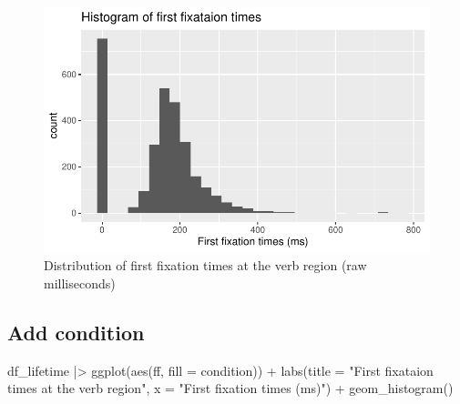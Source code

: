 \documentclass[
  letterpaper,
  DIV=11,
  numbers=noendperiod]{scrartcl}
\newenvironment{Shaded}{\begin{snugshade}}{\end{snugshade}}
\newcommand{\AttributeTok}[1]{\textcolor[rgb]{0.40,0.45,0.13}{#1}}
\newcommand{\FunctionTok}[1]{\textcolor[rgb]{0.28,0.35,0.67}{#1}}
\newcommand{\NormalTok}[1]{\textcolor[rgb]{0.00,0.23,0.31}{#1}}
\newcommand{\SpecialCharTok}[1]{\textcolor[rgb]{0.37,0.37,0.37}{#1}}
\newcommand{\StringTok}[1]{\textcolor[rgb]{0.13,0.47,0.30}{#1}}
\begin{document}
\begin{figure}[H]

{\centering \includegraphics{_data_viz_files/figure-pdf/unnamed-chunk-13-1.pdf}

}

\caption{Distribution of first fixation times at the verb region (raw
milliseconds)}

\end{figure}

\hypertarget{add-condition}{%
\subsection{Add condition}\label{add-condition}}

\begin{Shaded}
\begin{Highlighting}[]
\NormalTok{df\_lifetime }\SpecialCharTok{|\textgreater{}} \FunctionTok{ggplot}\NormalTok{(}\FunctionTok{aes}\NormalTok{(ff, }\AttributeTok{fill =}\NormalTok{ condition)) }\SpecialCharTok{+} 
  \FunctionTok{labs}\NormalTok{(}\AttributeTok{title =} \StringTok{"First fixataion times at the verb region"}\NormalTok{,}
       \AttributeTok{x =} \StringTok{"First fixation times (ms)"}\NormalTok{) }\SpecialCharTok{+}
  \FunctionTok{geom\_histogram}\NormalTok{()}
\end{Highlighting}
\end{Shaded}
\end{document}

